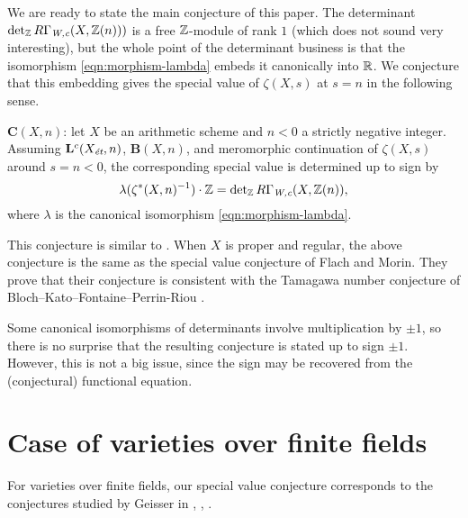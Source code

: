 \documentclass{article}
\numberwithin{equation}{section}
\begin{document}
We are ready to state the main conjecture of this paper. The determinant
$\det_\ZZ R\Gamma_\Wc (X, \ZZ (n)))$ is a free $\ZZ$-module of rank $1$ (which
does not sound very interesting), but the whole point of the determinant
business is that the isomorphism \eqref{eqn:morphism-lambda} embeds it
canonically into $\RR$. We conjecture that this embedding gives the special
value of $\zeta (X,s)$ at $s = n$ in the following sense.

\begin{conjecture}
  $\mathbf{C} (X,n)$: let $X$ be an arithmetic scheme and $n < 0$ a strictly
  negative integer. Assuming $\mathbf{L}^c (X_\et, n)$, $\mathbf{B} (X,n)$, and
  meromorphic continuation of $\zeta (X,s)$ around $s = n < 0$, the
  corresponding special value is determined up to sign by
  \[ \lambda (\zeta^* (X,n)^{-1}) \cdot \ZZ =
    \det_\ZZ R\Gamma_\Wc (X, \ZZ (n)), \]
  where $\lambda$ is the canonical isomorphism \eqref{eqn:morphism-lambda}.
\end{conjecture}

\begin{remark}
  This conjecture is similar to \cite[Conjecture~5.12]{Flach-Morin-2018}.
  When $X$ is proper and regular, the above conjecture is the same as the
  special value conjecture of Flach and Morin. They prove that their conjecture
  is consistent with the Tamagawa number conjecture of
  Bloch--Kato--Fontaine--Perrin-Riou \cite{Fontaine-Perrin-Riou-1994}.
\end{remark}

\begin{remark}
  Some canonical isomorphisms of determinants involve multiplication by $\pm 1$,
  so there is no surprise that the resulting conjecture is stated up to sign
  $\pm 1$. However, this is not a big issue, since the sign may be recovered
  from the (conjectural) functional equation.
\end{remark}


\section{Case of varieties over finite fields}
\label{sec:finite-fields}

For varieties over finite fields, our special value conjecture corresponds to
the conjectures studied by Geisser in \cite{Geisser-2004}, \cite{Geisser-2006},
\cite{Geisser-2010-arithmetic-homology}.
\end{document}
